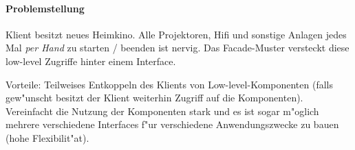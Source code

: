\paragraph{Problemstellung}
Klient besitzt neues Heimkino. Alle Projektoren, Hifi und sonstige Anlagen jedes Mal \emph{per Hand} zu starten / beenden ist nervig. Das Facade-Muster versteckt diese low-level Zugriffe hinter einem Interface. 

Vorteile: Teilweises Entkoppeln des Klients von Low-level-Komponenten (falls gew"unscht besitzt der Klient weiterhin Zugriff auf die Komponenten). Vereinfacht die Nutzung der Komponenten stark und es ist sogar m"oglich mehrere verschiedene Interfaces f"ur verschiedene Anwendungszwecke zu bauen (hohe Flexibilit"at). 
